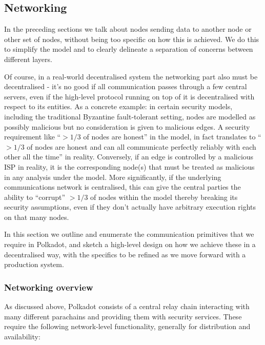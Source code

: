 \subsection{Networking}\label{sec:networking}

In the preceding sections we talk about nodes sending data to another node or
other set of nodes, without being too specific on how this is achieved. We do
this to simplify the model and to clearly delineate a separation of concerns
between different layers.

Of course, in a real-world decentralised system the networking part also must
be decentralised - it's no good if all communication passes through a few
central servers, even if the high-level protocol running on top of it is
decentralised with respect to its entities. As a concrete example: in certain
security models, including the traditional Byzantine fault-tolerant setting,
nodes are modelled as possibly malicious but no consideration is given to
malicious edges. A security requirement like “$> 1/3$ of nodes are honest” in
the model, in fact translates to “$> 1/3$ of nodes are honest and can all
communicate perfectly reliably with each other all the time” in reality.
Conversely, if an edge is controlled by a malicious ISP in reality, it is the
corresponding node(s) that must be treated as malicious in any analysis under
the model. More significantly, if the underlying communications network is
centralised, this can give the central parties the ability to “corrupt” $> 1/3$
of nodes within the model thereby breaking its security assumptions, even if
they don't actually have arbitrary execution rights on that many nodes.

In this section we outline and enumerate the communication primitives that we
require in Polkadot, and sketch a high-level design on how we achieve these in
a decentralised way, with the specifics to be refined as we move forward with a
production system.

\subsubsection{Networking overview}

As discussed above, Polkadot consists of a central relay chain interacting with
many different parachains and providing them with security services. These
require the following network-level functionality, generally for distribution
and availability:

